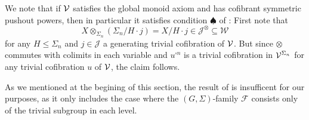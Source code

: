 \documentclass[a4paper,10pt
]{article}%
\renewcommand{\F}{\mathcal F}
\renewcommand{\1}{\eta}%
\begin{document}
\begin{remark}
	We note that if $\mathcal V$ satisfies the global monoid axiom and has cofibrant symmetric pushout powers,
	then in particular it satisfies condition $\spadesuit$ of \cite[Thm. 6.1.1]{WY18}:
	First note that
	\[
	X \otimes_{\Sigma_n} (\Sigma_n / H \cdot j) = X/H \cdot j \in \mathcal J^{\otimes} \subseteq \mathcal W
	\]
	for any $H \leq \Sigma_n$ and $j \in \mathcal J$ a generating trivial cofibration of $\mathcal V$.
	But since $\otimes$ commutes with colimits in each variable
	and $u^{\square n}$ is a trivial cofibration in $\mathcal V^{\Sigma_n}$ for any trivial cofibration $u$ of $\mathcal V$,
	the claim follows.
	
	As we mentioned at the begining of this section, the result of \cite[Thm. 6.1.1]{WY18} is insufficent for our purposes,
	as it only includes the case where
	the $(G,\Sigma)$-family $\F$ consists only of the trivial subgroup in each level.
\end{remark}






{}

\end{document}
